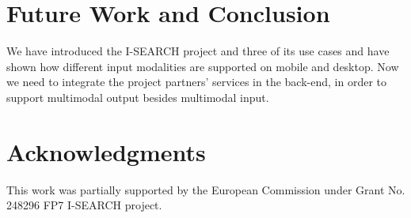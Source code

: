 \documentclass{acm_proc_article-sp}
\newcommand{\inlinelistingsize}{\fontsize{8pt}{11pt}}
\let\oldttdefault\ttdefault
\renewcommand{\ttdefault}{pcr}
\let\oldurl\url
\renewcommand{\url}[1]{\inlinelistingsize\oldurl{#1}}
\begin{document}
\section{Future Work and Conclusion}
We have introduced the \mbox{I-SEARCH} project and three of its use cases and have shown how different input modalities are supported on mobile and desktop. Now we need to integrate the project partners' services in the back-end, in order to support multimodal output besides multimodal input.

\section{Acknowledgments}
This work was partially supported by the European Commission under Grant No. 248296 FP7 \mbox{I-SEARCH} project.

\let\ttdefault\oldttdefault
\let\url\oldurl




\balancecolumns
\end{document}
